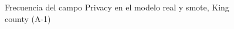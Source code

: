 \begin{figure}[H]
    \centering
    
    \caption{Frecuencia del campo Privacy en el modelo real y smote, King county (A-1)}
    \label{frecuency-smote-privacy}
\end{figure}
